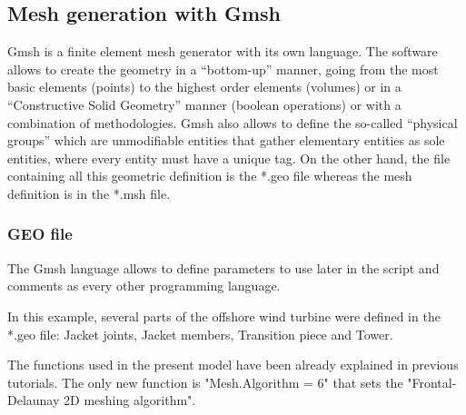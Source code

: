 \documentclass[a4]{article}
\begin{document}
\subsection{Mesh generation with Gmsh}
Gmsh \cite{gmsh, gmshweb} is a finite element mesh generator with its own language. The software allows to create the geometry in a “bottom-up” manner, going from the most basic elements (points) to the highest order elements (volumes) or in a “Constructive Solid Geometry” manner (boolean operations) or with a combination of methodologies. Gmsh also allows to define  the so-called “physical groups” which are unmodifiable entities that gather elementary entities as sole entities, where every entity must have a unique tag. On the other hand, the file containing all this geometric definition is the *.geo file whereas the mesh definition is in the *.msh file. 

\subsubsection{GEO file}
The Gmsh language allows to define parameters to use later in the script and comments as every other programming language. 

In this example, several parts of the offshore wind turbine were defined in the *.geo file: Jacket joints, Jacket members, Transition piece and Tower.  

The functions used in the present model have been already explained in previous tutorials. The only new function is "Mesh.Algorithm = 6" that sets the "Frontal-Delaunay 2D meshing algorithm".
\end{document}
